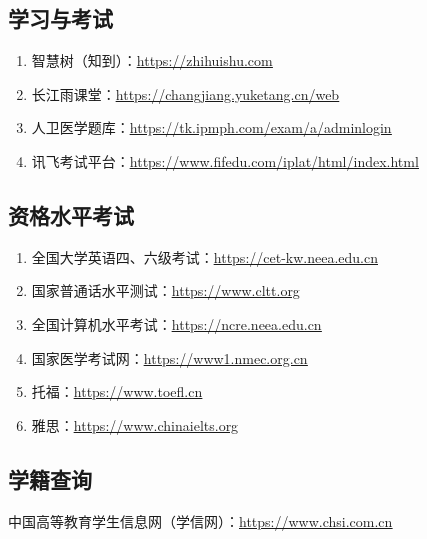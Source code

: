 \subsection[学习与考试]{学习与考试}
\begin{enumerate}
    \item 智慧树（知到）：\uline{\href{https://zhihuishu.com}{https://zhihuishu.com}}
    \item 长江雨课堂：\uline{\href{https://changjiang.yuketang.cn/web}{https://changjiang.yuketang.cn/web}}
    \item 人卫医学题库：\uline{\href{https://tk.ipmph.com/exam/a/adminlogin}{https://tk.ipmph.com/exam/a/adminlogin}}
    \item 讯飞考试平台：\uline{\href{https://www.fifedu.com/iplat/html/index.html}{https://www.fifedu.com/iplat/html/index.html}}
\end{enumerate}

\subsection[资格水平考试]{资格水平考试}
\begin{enumerate}
    \item 全国大学英语四、六级考试：\uline{\href{https://cet-kw.neea.edu.cn}{https://cet-kw.neea.edu.cn}}
    \item 国家普通话水平测试：\uline{\href{https://www.cltt.org}{https://www.cltt.org}}
    \item 全国计算机水平考试：\uline{\href{https://ncre.neea.edu.cn}{https://ncre.neea.edu.cn}}
    \item 国家医学考试网：\uline{\href{https://www1.nmec.org.cn}{https://www1.nmec.org.cn}}
    \item 托福：\uline{\href{https://www.toefl.cn}{https://www.toefl.cn}}
    \item 雅思：\uline{\href{https://www.chinaielts.org}{https://www.chinaielts.org}}
\end{enumerate}

\subsection[学籍查询]{学籍查询}
\label{student_status_query}
中国高等教育学生信息网（学信网）：\uline{\href{https://www.chsi.com.cn}{https://www.chsi.com.cn}}

\newpage
